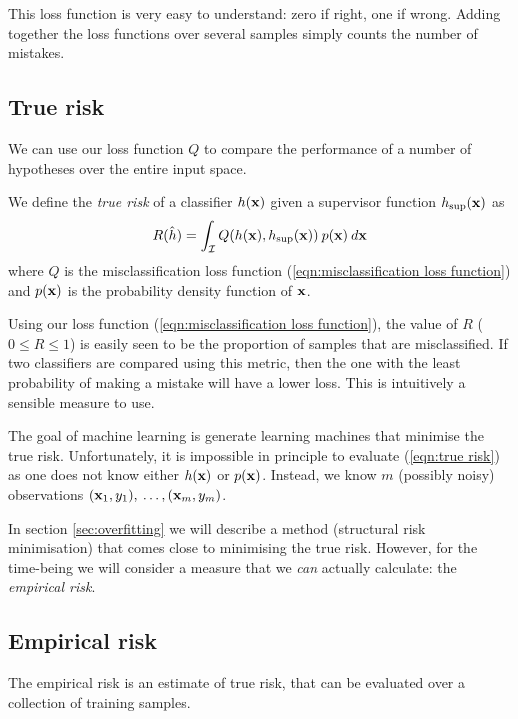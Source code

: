This loss function is very easy to understand: zero if right, one if
wrong.  Adding together the loss functions over several samples simply
counts the number of mistakes.


\subsection{True risk}
\label{sec:true risk}

We can use our loss function $Q$ to compare the performance of a
number of hypotheses over the entire input space.

\begin{definition}
We define the \emph{true risk} of a classifier $h(\mathbf{x})$ given a
supervisor function $h_{\sup}(\mathbf{x})$ as 
%
\begin{equation}
R(\hat{h}) = \int_{\mathcal{I}} Q(h(\mathbf{x}), h_{\sup}(\mathbf{x})) \: p(\mathbf{x}) \: d\mathbf{x}
\label{eqn:true risk}
\end{equation}
%
where $Q$ is the misclassification loss function
(\ref{eqn:misclassification loss function}) and $p(\mathbf{x})$ is the
probability density function of $\mathbf{x}$.
\end{definition}


Using our loss function (\ref{eqn:misclassification loss function}), the
value of $R$ ($0 \leq R \leq 1$) is easily seen to be the proportion
of samples that are misclassified.  If two classifiers are compared
using this metric, then the one with the least probability of making a
mistake will have a lower loss.  This is intuitively a sensible
measure to use.

The goal of machine learning is generate learning machines that
minimise the true risk.  Unfortunately, it is impossible in
principle to evaluate (\ref{eqn:true risk}) as one does not know
either $h(\mathbf{x})$ or $p(\mathbf{x})$.   Instead, we know $m$ (possibly noisy)
observations $(\mathbf{x}_1, y_1),\: \ldots, (\mathbf{x}_m, y_m)$.

In section \ref{sec:overfitting} we will describe a method (structural
risk minimisation) that comes close to minimising the true risk.
However, for the time-being we will consider a measure that we
\emph{can} actually calculate: the \emph{empirical risk}.


\subsection{Empirical risk}
\label{sec:empirical risk}
The empirical risk is an estimate of true risk, that can be evaluated
over a collection of training samples.

